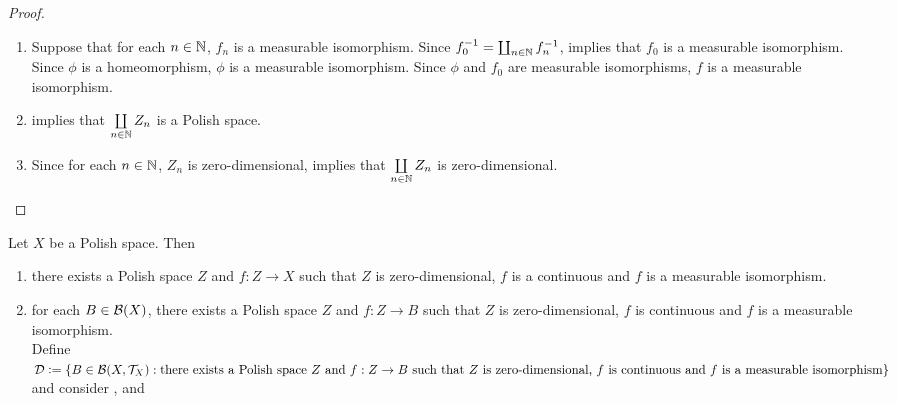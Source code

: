 \documentclass{book}
\begin{document}
\begin{proof}
\begin{enumerate}
\begin{align*}
			 	& = \phi(m, f_m(z_y)).
			\end{align*}
			Since $\phi$ is a bijection, $(n, f_n(z_x)) = (m, f_m(z_y))$. Thus $n = m$ and therefore $f_n(z_x) = f_n(z_y)$. Since $f_n$ is injective, $z_x = z_y$. Thus 
			\begin{align*}
				x
				& = (n, z_x) \\
				& = (n, z_y) \\
				& = y.
			\end{align*}
			Since $x, y \in \coprod\limits_{n \in \N} Z_n$ are arbitrary, we have that for each $x, y \in  \coprod\limits_{n \in \N} Z_n$, $f(x) = f(y)$ implies that $x = y$. Thus $f$ is injective.
			\item Suppose that for each $n \in \mathbb{N}$, $f_n$ is a measurable isomorphism. Since $f_0^{-1} = \coprod_{n \in \mathbb{N}} f_n^{-1}$,  implies that $f_0$ is a measurable isomorphism. Since $\phi$ is a homeomorphism, $\phi$ is a measurable isomorphism. Since $\phi$ and $f_0$ are measurable isomorphisms, $f$ is a measurable isomorphism.
			\item {} implies that $\coprod\limits_{n \in \mathbb{N}} Z_n$ is a Polish space.
			\item Since for each $n \in \mathbb{N}$, $Z_n$ is zero-dimensional,  implies that $\coprod\limits_{n \in \mathbb{N}} Z_n$ is zero-dimensional. 
		\end{enumerate}
	\end{proof}


	\begin{ex} 
		Let $X$ be a Polish space. Then
		\begin{enumerate}
			\item there exists a Polish space $Z$ and $f:Z \rightarrow X$ such that $Z$ is zero-dimensional, $f$ is a continuous and $f$ is a measurable isomorphism. \\
			 
			\item for each $B \in \mathcal{B}(X)$, there exists a Polish space $Z$ and $f:Z \rightarrow B$ such that $Z$ is zero-dimensional, $f$ is continuous and $f$ is a measurable isomorphism. \\
			 Define 
			$\mathcal{D} \vcentcolon= \{B \in \mathcal{B}(X, \mathcal{T}_X): \text{there exists a Polish space $Z$ and $f:Z \rightarrow B$ such that $Z$ is zero-dimensional, } \\ \text{$f$ is continuous and $f$ is a measurable isomorphism}\}$ and consider ,  and 
		\end{enumerate}
	\end{ex}
	
\end{document}
